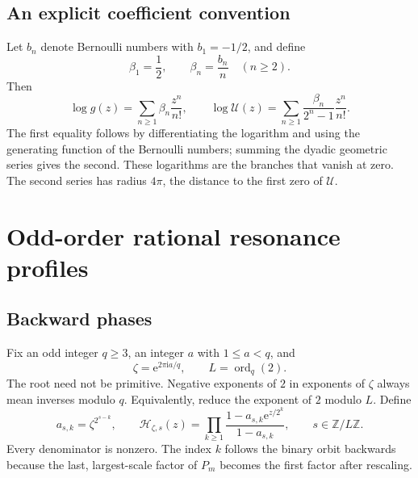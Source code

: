 \documentclass[11pt,a4paper,oneside,openany]{book}
\numberwithin{equation}{chapter}
\theoremstyle{definition}
\theoremstyle{remark}
\newcommand{\Z}{\mathbb Z}
\newcommand{\e}{\mathrm e}
\newcommand{\ii}{\mathrm i}
\DeclareMathOperator{\ord}{ord}
\newcommand{\Up}{\mathcal U}
\newcommand{\Hp}{\mathcal H}
\begin{document}
\section{An explicit coefficient convention}
Let \(b_n\) denote Bernoulli numbers with \(b_1=-1/2\), and define
\begin{equation}
 \beta_1=\frac12,\qquad \beta_n=\frac{b_n}{n}\quad(n\geq2).
 \label{rr:eq:beta}
\end{equation}
Then
\begin{equation}
 \log g(z)=\sum_{n\geq1}\beta_n\frac{z^n}{n!},\qquad
 \log\Up(z)=\sum_{n\geq1}\frac{\beta_n}{2^n-1}\frac{z^n}{n!}.
 \label{rr:eq:Ulog}
\end{equation}
The first equality follows by differentiating the logarithm and using the generating function of the Bernoulli numbers; summing the dyadic geometric series gives the second. These logarithms are the branches that vanish at zero. The second series has radius \(4\pi\), the distance to the first zero of \(\Up\).
\chapter{Odd-order rational resonance profiles}
\label{rr:sec:profiles}

\section{Backward phases}
Fix an odd integer \(q\geq3\), an integer \(a\) with \(1\leq a<q\), and
\begin{equation}
 \zeta=\e^{2\pi\ii a/q},\qquad L=\ord_q(2).
\end{equation}
The root need not be primitive. Negative exponents of \(2\) in exponents of \(\zeta\) always mean inverses modulo \(q\). Equivalently, reduce the exponent of \(2\) modulo \(L\). Define
\begin{equation}
 a_{s,k}=\zeta^{2^{s-k}},\qquad
 \Hp_{\zeta,s}(z)=\prod_{k\geq1}
 \frac{1-a_{s,k}\e^{z/2^k}}{1-a_{s,k}},
 \qquad s\in\Z/L\Z.
 \label{rr:eq:H}
\end{equation}
Every denominator is nonzero. The index \(k\) follows the binary orbit backwards because the last, largest-scale factor of \(P_m\) becomes the first factor after rescaling.
\end{document}

